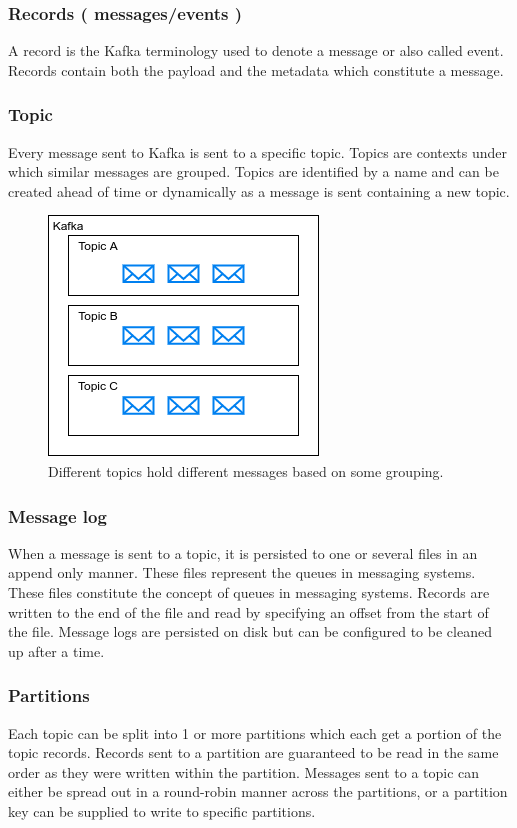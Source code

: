 \documentclass[11pt]{article}
\begin{document}
\subsubsection{Records ( messages/events ) }
A record is the Kafka terminology used to denote a message or also called event. Records contain both the payload and the metadata which constitute a message.

\subsubsection{Topic}
Every message sent to Kafka is sent to a specific topic. Topics are contexts under which similar messages are grouped. Topics are identified by a name and can be created ahead of time or dynamically as a message is sent containing a new topic.

\begin{figure}[htbp]
\centerline{\includegraphics[scale=0.7]{assets/topics.png}}
\caption{Different topics hold different messages based on some grouping.}
\label{fig}
\end{figure}

\subsubsection{Message log}

When a message is sent to a topic, it is persisted to one or several files in an append only manner. These files represent the queues in messaging systems. These files constitute the concept of queues in messaging systems. Records are written to the end of the file and read by specifying an offset from the start of the file. Message logs are persisted on disk but can be configured to be cleaned up after a time.


\subsubsection{Partitions}
Each topic can be split into 1 or more partitions which each get a portion of the topic records. Records sent to a partition are guaranteed to be read in the same order as they were written within the partition. Messages sent to a topic can either be spread out in a round-robin manner across the partitions, or a partition key can be supplied to write to specific partitions.
\end{document}
